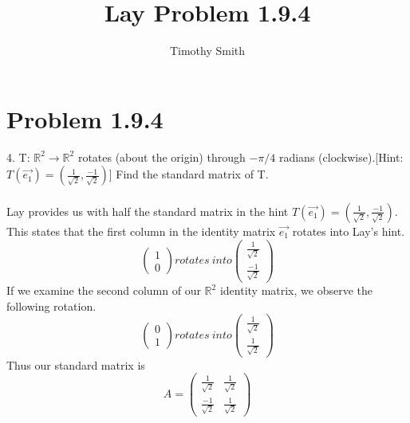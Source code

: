 \documentclass{article}
\begin{document}
\author{Timothy Smith}
\title{Lay Problem 1.9.4}
\maketitle

\section{Problem 1.9.4}
4. T: $\mathbb{R}^2 \longrightarrow \mathbb{R}^2 $ rotates (about the origin) through $-\pi/4$ radians (clockwise).[Hint: $T(\vec{e_1})=(\frac{1}{\sqrt{2}},\frac{-1}{\sqrt{2}})$] Find the standard matrix of T.
\\
\\
 Lay provides us with half the standard matrix in the hint $T(\vec{e_1})=(\frac{1}{\sqrt{2}},\frac{-1}{\sqrt{2}})$. This states that the first column in the identity matrix $\vec{e_1}$  rotates into Lay's hint.
 \[
 \begin{pmatrix}
 1\\
 0
 \end{pmatrix}
 rotates\ into
  \begin{pmatrix}
\frac{1}{\sqrt{2}} \\
 \frac{-1}{\sqrt{2}}
 \end{pmatrix}
\] 
 If we examine the second column of our $\mathbb{R}^2$ identity matrix, we observe the following rotation.
 \[
  \begin{pmatrix}
 0\\
 1
 \end{pmatrix}
 rotates\ into
  \begin{pmatrix}
\frac{1}{\sqrt{2}} \\
 \frac{1}{\sqrt{2}}
 \end{pmatrix}
 \]
 Thus our standard matrix is
\[
 A=
 \begin{pmatrix}
 \frac{1}{\sqrt{2}}   &\frac{1}{\sqrt{2}}\\
 \frac{-1}{\sqrt{2}} & \frac{1}{\sqrt{2}}
\end{pmatrix}
 \]
 
\end{document}

